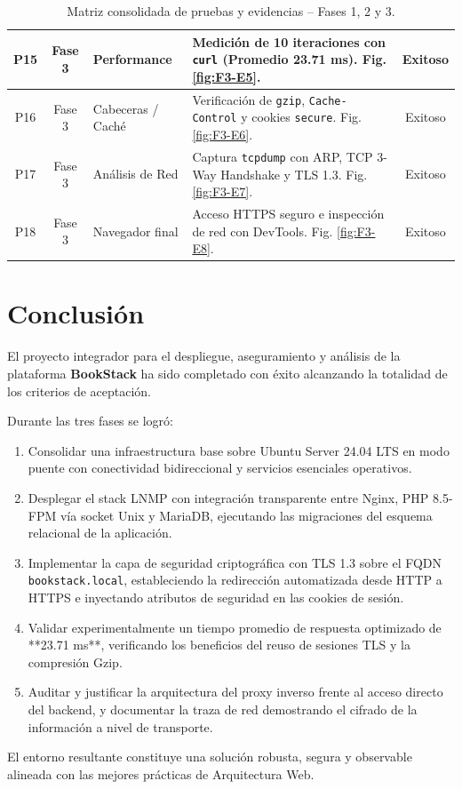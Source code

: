 \documentclass[12pt,a4paper]{article}
\begin{document}
\begin{table}[h!]
\begin{tabular}{|c|c|p{2.8cm}|p{6.6cm}|c|}
P15 & Fase 3 & Performance & Medición de 10 iteraciones con \texttt{curl} (Promedio 23.71 ms). Fig. \ref{fig:F3-E5}. & Exitoso \\ \hline
P16 & Fase 3 & Cabeceras / Caché & Verificación de \texttt{gzip}, \texttt{Cache-Control} y cookies \texttt{secure}. Fig. \ref{fig:F3-E6}. & Exitoso \\ \hline
P17 & Fase 3 & Análisis de Red & Captura \texttt{tcpdump} con ARP, TCP 3-Way Handshake y TLS 1.3. Fig. \ref{fig:F3-E7}. & Exitoso \\ \hline
P18 & Fase 3 & Navegador final & Acceso HTTPS seguro e inspección de red con DevTools. Fig. \ref{fig:F3-E8}. & Exitoso \\ \hline
\end{tabular}
\caption{Matriz consolidada de pruebas y evidencias -- Fases 1, 2 y 3.}
\label{tab:matriz_pruebas}
\end{table}

\section{Conclusión}
El proyecto integrador para el despliegue, aseguramiento y análisis de la plataforma \textbf{BookStack} ha sido completado con éxito alcanzando la totalidad de los criterios de aceptación.

Durante las tres fases se logró:
\begin{enumerate}
    \item Consolidar una infraestructura base sobre Ubuntu Server 24.04 LTS en modo puente con conectividad bidireccional y servicios esenciales operativos.
    \item Desplegar el stack LNMP con integración transparente entre Nginx, PHP 8.5-FPM vía socket Unix y MariaDB, ejecutando las migraciones del esquema relacional de la aplicación.
    \item Implementar la capa de seguridad criptográfica con TLS 1.3 sobre el FQDN \texttt{bookstack.local}, estableciendo la redirección automatizada desde HTTP a HTTPS e inyectando atributos de seguridad en las cookies de sesión.
    \item Validar experimentalmente un tiempo promedio de respuesta optimizado de **23.71 ms**, verificando los beneficios del reuso de sesiones TLS y la compresión Gzip.
    \item Auditar y justificar la arquitectura del proxy inverso frente al acceso directo del backend, y documentar la traza de red demostrando el cifrado de la información a nivel de transporte.
\end{enumerate}

El entorno resultante constituye una solución robusta, segura y observable alineada con las mejores prácticas de Arquitectura Web.
\end{document}
